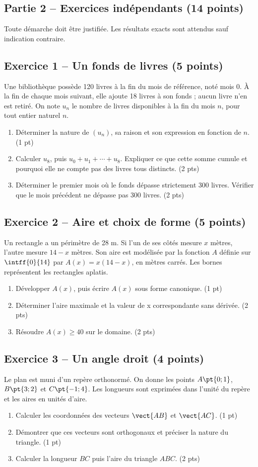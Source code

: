 \mxnewpage\subsection*{Partie 2 -- Exercices indépendants (14 points)}
Toute démarche doit être justifiée. Les résultats exacts sont attendus sauf indication contraire.
\subsection*{Exercice 1 -- Un fonds de livres (5 points)}
Une bibliothèque possède 120 livres à la fin du mois de référence, noté mois 0. À la fin de chaque mois suivant, elle ajoute 18 livres à son fonds ; aucun livre n’en est retiré. On note $u_n$ le nombre de livres disponibles à la fin du mois $n$, pour tout entier naturel $n$.
\begin{enumerate}
\item Déterminer la nature de $(u_n)$, sa raison et son expression en fonction de $n$. \hfill(1 pt)
\item Calculer $u_8$, puis $u_0+u_1+\cdots+u_8$. Expliquer ce que cette somme cumule et pourquoi elle ne compte pas des livres tous distincts. \hfill(2 pts)
\item Déterminer le premier mois où le fonds dépasse strictement 300 livres. Vérifier que le mois précédent ne dépasse pas 300 livres. \hfill(2 pts)
\end{enumerate}
\subsection*{Exercice 2 -- Aire et choix de forme (5 points)}
Un rectangle a un périmètre de 28 m. Si l’un de ses côtés mesure $x$ mètres, l’autre mesure $14-x$ mètres. Son aire est modélisée par la fonction $A$ définie sur $\intff{0}{14}$ par $A(x)=x(14-x)$, en mètres carrés. Les bornes représentent les rectangles aplatis.
\begin{enumerate}
\item Développer $A(x)$, puis écrire $A(x)$ sous forme canonique. \hfill(1 pt)
\item Déterminer l’aire maximale et la valeur de x correspondante sans dérivée. \hfill(2 pts)
\item Résoudre $A(x)\geq40$ sur le domaine. \hfill(2 pts)
\end{enumerate}
\subsection*{Exercice 3 -- Un angle droit (4 points)}
Le plan est muni d’un repère orthonormé. On donne les points $A\pt{0;1}$, $B\pt{3;2}$ et $C\pt{-1;4}$. Les longueurs sont exprimées dans l’unité du repère et les aires en unités d’aire.
\begin{enumerate}
\item Calculer les coordonnées des vecteurs $\vect{AB}$ et $\vect{AC}$. \hfill(1 pt)
\item Démontrer que ces vecteurs sont orthogonaux et préciser la nature du triangle. \hfill(1 pt)
\item Calculer la longueur $BC$ puis l’aire du triangle $ABC$. \hfill(2 pts)
\end{enumerate}
